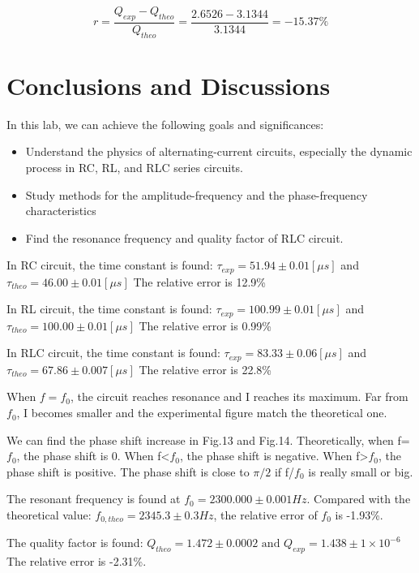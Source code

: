 \documentclass[12pt,a4paper]{article}
\begin{document}
$$r=\frac{Q_{exp}-Q_{theo}}{Q_{theo}}=\frac{2.6526-3.1344}{3.1344}=-15.37\%$$


\section{Conclusions and Discussions}

In this lab, we can achieve the following goals and significances:
\begin{itemize}
    \item Understand the physics of alternating-current circuits, especially the dynamic process in RC, RL, and RLC series circuits.
    \item Study methods for the amplitude-frequency and the phase-frequency characteristics
    \item Find the resonance frequency and quality factor of RLC circuit.
\end{itemize}

In RC circuit, the time constant is found: $\tau_{exp}=51.94\pm0.01[\mu s]$ and $\tau_{theo}=46.00\pm0.01[\mu s]$ The relative error is 12.9\% \par

In RL circuit, the time constant is found: ${\tau}_{exp}=100.99\pm0.01[\mu s]$ and ${\tau}_{theo}=100.00\pm0.01[\mu s]$ The relative error is 0.99\% \par 

In RLC circuit, the time constant is found: ${\tau}_{exp}=83.33\pm0.06[\mu s]$ and ${\tau}_{theo}=67.86\pm\mathrm{0.007}[\mu s]$ The relative error is 22.8\% \par 
When $f=f_0$, the circuit reaches resonance and I reaches its maximum. Far from $f_0$, I becomes smaller and the experimental figure match the theoretical one.\par 
We can find the phase shift increase in Fig.13 and Fig.14. Theoretically, when f=$f_0$, the phase shift is 0. When f<$f_0$, the phase shift is negative. When f>$f_0$, the phase shift is positive. The phase shift is close to $\pi/2$ if f/$f_0$ is really small or big. \par 
The resonant frequency is found at $f_0=2300.000\pm0.001Hz$. Compared with the theoretical value: $f_{0,theo}=2345.3\pm0.3Hz$, the relative error of $f_0$ is -1.93\%. \par 
The quality factor is found: $Q_{theo}=1.472\pm0.0002\text{ and }Q_{exp}=1.438\pm1\times{10}^{-6}$
The relative error is -2.31\%.\par 
\end{document}
